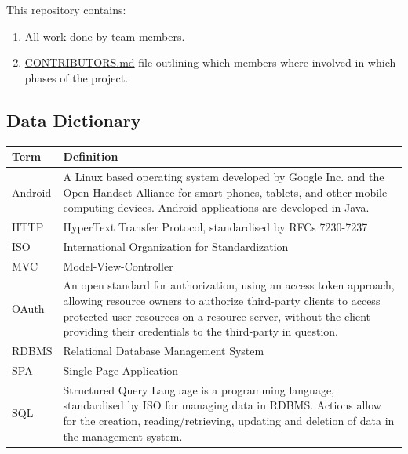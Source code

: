 \documentclass[a4paper,10pt]{article}
\begin{document}
This repository contains:
\begin{enumerate}
\item All work done by team members.
\item \href{https://github.com/andrewbroekman/echo/blob/master/CONTRIBUTORS.md}{CONTRIBUTORS.md} file outlining which members where involved in which phases of the project.
\end{enumerate}

\begin{appendices}
\newpage
\section{Data Dictionary}
\begin{tabu} to \textwidth { | X[l] | X[l] | }
	\hline
		\textbf{Term}		& \textbf{Definition}	\\ \hline \hline
		Android			&  A Linux based operating system developed by Google Inc. and the Open Handset Alliance for smart phones, tablets, and other mobile computing devices. Android applications are developed in Java. \\ \hline
		HTTP			& HyperText Transfer Protocol, standardised by RFCs 7230-7237 \\ \hline
		ISO				& International Organization for Standardization \\ \hline
		MVC				& Model-View-Controller \\ \hline
		OAuth			& An open standard for authorization, using an access token approach, allowing resource owners to authorize third-party clients to access protected user resources on a resource server, without the client providing their credentials to the third-party in question. \\ \hline
		RDBMS			& Relational Database Management System \\ \hline
		SPA				& Single Page Application \\ \hline
		SQL				& Structured Query Language is a programming language, standardised by ISO for managing data in RDBMS. Actions allow for the creation, reading/retrieving, updating and deletion of data in the management system. \\ \hline
	\hline
\end{tabu}

\end{appendices}

\newpage
\clearpage
{}
\printbibliography
\listoffigures
\end{document}
